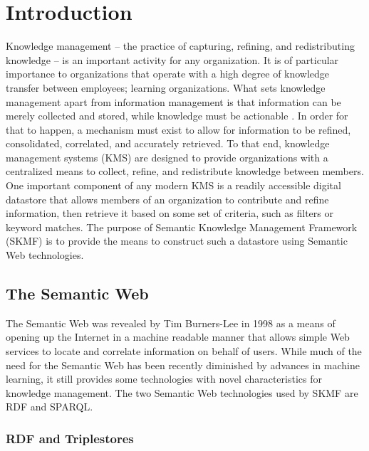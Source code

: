 \chapter{Introduction}
\label{intro}

Knowledge management -- the practice of capturing, refining, and redistributing knowledge -- is an important activity for any organization. It is of particular importance to organizations that operate with a high degree of knowledge transfer between employees; learning organizations. What sets knowledge management apart from information management is that information can be merely collected and stored, while knowledge must be actionable
\cite{kmtoolkit}.
In order for that to happen, a mechanism must exist to allow for information to be refined, consolidated, correlated, and accurately retrieved. To that end, knowledge management systems (KMS) are designed to provide organizations with a centralized means to collect, refine, and redistribute knowledge between members. One important component of any modern KMS is a readily accessible digital datastore that allows members of an organization to contribute and refine information, then retrieve it based on some set of criteria, such as filters or keyword matches. The purpose of Semantic Knowledge Management Framework (SKMF) is to provide the means to construct such a datastore using Semantic Web technologies.


\section{The Semantic Web}
\label{intro:semantic}

The Semantic Web was revealed by Tim Burners-Lee in 1998
\cite{bernerslee}
as a means of opening up the Internet in a machine readable manner that allows simple Web services to locate and correlate information on behalf of users. While much of the need for the Semantic Web has been recently diminished by advances in machine learning, it still provides some technologies with novel characteristics for knowledge management. The two Semantic Web technologies used by SKMF are RDF and SPARQL.


\subsection{RDF and Triplestores}
\label{intro:rdf}

